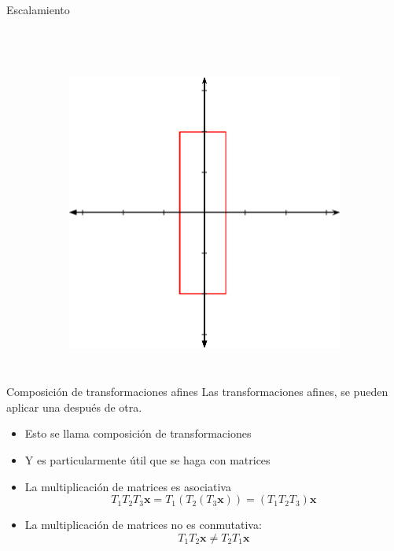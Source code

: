 \begin{frame}{Escalamiento}
\begin{columns}
\begin{figure}[htp]
\begin{subfigure}[b]{0.4\textwidth}
 \end{subfigure}
\\
\vspace{0.15cm}
 \begin{subfigure}[b]{0.4\textwidth}
   \includegraphics[width=\textwidth]{img/Scalated}
 \end{subfigure}
\end{figure}
\end{columns}
\end{frame}

\begin{frame}{Composición de transformaciones afines}
Las transformaciones afines, se pueden aplicar una después de otra. 
\begin{itemize}
    \item Esto se llama \alert{composición de transformaciones}
    \item Y es particularmente útil que se haga con matrices
    \item La multiplicación de matrices es asociativa 
    $$T_1 T_2 T_3 \mathbf{x} = T_1 (T_2 (T_3 \mathbf{x})) = (T_1 T_2 T_3) \mathbf{x}$$
    \item La multiplicación de matrices no es conmutativa: 
    $$T_1 T_2 \mathbf{x} \neq T_2 T_1 \mathbf{x}$$
\end{itemize}
\end{frame}

